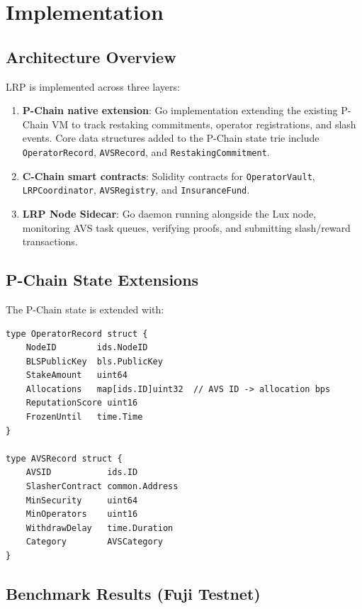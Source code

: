 \section{Implementation}

\label{sec:implementation}

\subsection{Architecture Overview}

LRP is implemented across three layers:

\begin{enumerate}[leftmargin=1.5em]
  \item \textbf{P-Chain native extension}: Go implementation extending the existing P-Chain
    VM to track restaking commitments, operator registrations, and slash events. Core data
    structures added to the P-Chain state trie include \texttt{OperatorRecord},
    \texttt{AVSRecord}, and \texttt{RestakingCommitment}.
  \item \textbf{C-Chain smart contracts}: Solidity contracts for \texttt{OperatorVault},
    \texttt{LRPCoordinator}, \texttt{AVSRegistry}, and \texttt{InsuranceFund}.
  \item \textbf{LRP Node Sidecar}: Go daemon running alongside the Lux node, monitoring
    AVS task queues, verifying proofs, and submitting slash/reward transactions.
\end{enumerate}

\subsection{P-Chain State Extensions}

The P-Chain state is extended with:

\begin{verbatim}
type OperatorRecord struct {
    NodeID        ids.NodeID
    BLSPublicKey  bls.PublicKey
    StakeAmount   uint64
    Allocations   map[ids.ID]uint32  // AVS ID -> allocation bps
    ReputationScore uint16
    FrozenUntil   time.Time
}

type AVSRecord struct {
    AVSID           ids.ID
    SlasherContract common.Address
    MinSecurity     uint64
    MinOperators    uint16
    WithdrawDelay   time.Duration
    Category        AVSCategory
}
\end{verbatim}

\subsection{Benchmark Results (Fuji Testnet)}

